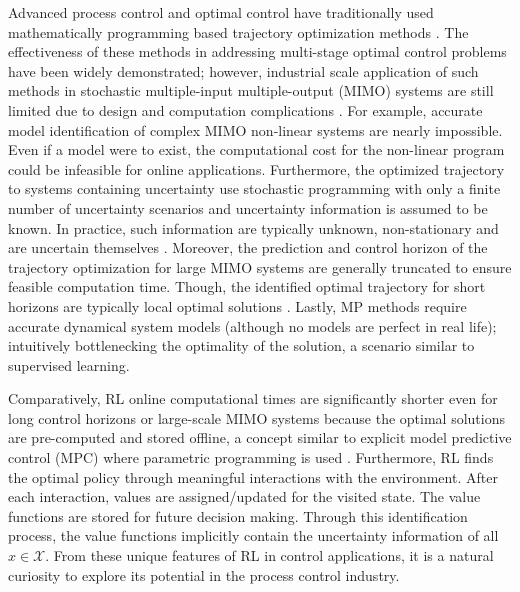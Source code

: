 %
% 
Advanced process control and optimal control have traditionally used mathematically programming based trajectory optimization methods \cite{empc2, zone_mpc, mpc, empc1,}.  The effectiveness of these methods in addressing multi-stage optimal control problems have been widely demonstrated; however, industrial scale application of such methods in stochastic multiple-input multiple-output (MIMO) systems are still limited due to design and computation complications \cite{MS}. For example, accurate model identification of complex MIMO non-linear systems are nearly impossible. Even if a model were to exist, the computational cost for the non-linear program could be infeasible for online applications. Furthermore, the optimized trajectory to systems containing uncertainty use stochastic programming with only a finite number of uncertainty scenarios and uncertainty information is assumed to be known. In practice, such information are typically unknown, non-stationary and are uncertain themselves \cite{jayCCE}. Moreover, the prediction and control horizon of the trajectory optimization for large MIMO systems are generally truncated to ensure feasible computation time. Though, the identified optimal trajectory for short horizons are typically local optimal solutions \cite{mpc}. Lastly, MP methods require accurate dynamical system models (although no models are perfect in real life); intuitively bottlenecking the optimality of the solution, a scenario similar to supervised learning.

Comparatively, RL online computational times are significantly shorter even for long control horizons or large-scale MIMO systems because the optimal solutions are pre-computed and stored offline, a concept similar to explicit model predictive control (MPC) where parametric programming is used \cite{explicit_MPC}. Furthermore, RL finds the optimal policy through meaningful interactions with the environment.  After each interaction, values are assigned/updated for the visited state. The value functions are stored for future decision making.  Through this identification process, the value functions implicitly contain the uncertainty information of all $x \in \mathcal{X}$. From these unique features of RL in control applications, it is a natural curiosity to explore its potential in the process control industry.

